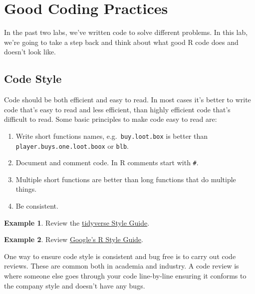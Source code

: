 \documentclass[
]{book}
\providecommand{\tightlist}{%
  \setlength{\itemsep}{0pt}\setlength{\parskip}{0pt}}
\theoremstyle{definition}
\theoremstyle{definition}
\newtheorem{example}{Example}[chapter]
\theoremstyle{definition}
\theoremstyle{definition}
\theoremstyle{remark}
\begin{document}
\hypertarget{good-coding-practices}{%
\section{Good Coding Practices}\label{good-coding-practices}}

In the past two labs, we've written code to solve different problems. In this lab, we're going to take a step back and think about what good R code does and doesn't look like.

\hypertarget{code-style}{%
\subsection{Code Style}\label{code-style}}

Code should be both efficient and easy to read. In most cases it's better to write code that's easy to read and less efficient, than highly efficient code that's difficult to read. Some basic principles to make code easy to read are:

\begin{enumerate}
\def\labelenumi{\arabic{enumi}.}
\tightlist
\item
  Write short functions names, e.g.~\texttt{buy.loot.box} is better than \texttt{player.buys.one.loot.boox} or \texttt{blb}.
\item
  Document and comment code. In R comments start with \texttt{\#}.
\item
  Multiple short functions are better than long functions that do multiple things.
\item
  Be consistent.
\end{enumerate}

\begin{example}
Review the \href{https://style.tidyverse.org/index.html}{tidyverse Style Guide}.
\end{example}

\begin{example}
Review \href{https://google.github.io/styleguide/Rguide.html}{Google's R Style Guide}.
\end{example}

One way to ensure code style is consistent and bug free is to carry out code reviews. These are common both in academia and industry. A code review is where someone else goes through your code line-by-line ensuring it conforms to the company style and doesn't have any bugs.
\end{document}
